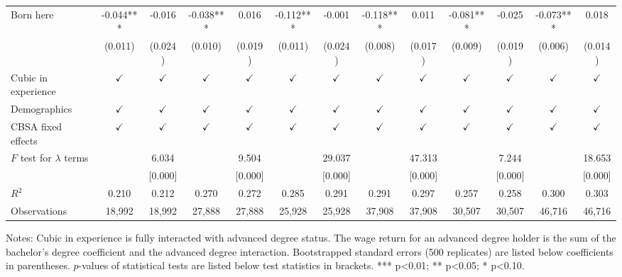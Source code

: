\begin{table}[ht]
{\begin{threeparttable}
\begin{tabular}{lcccccccccccc}
Born here & -0.044*** & -0.016 & -0.038*** & 0.016 & -0.112*** & -0.001 & -0.118*** & 0.011 & -0.081*** & -0.025 & -0.073*** & 0.018    \\
 & (0.011) & (0.024) & (0.010) & (0.019) & (0.011) & (0.024) & (0.008) & (0.017) & (0.009) & (0.019) & (0.006) & (0.014) \\
Cubic in experience & $\checkmark$ & $\checkmark$ & $\checkmark$ & $\checkmark$ & $\checkmark$ & $\checkmark$ & $\checkmark$ & $\checkmark$ & $\checkmark$ & $\checkmark$ & $\checkmark$ & $\checkmark$\\
Demographics        & $\checkmark$ & $\checkmark$ & $\checkmark$ & $\checkmark$ & $\checkmark$ & $\checkmark$ & $\checkmark$ & $\checkmark$ & $\checkmark$ & $\checkmark$ & $\checkmark$ & $\checkmark$\\
CBSA fixed effects  & $\checkmark$ & $\checkmark$ & $\checkmark$ & $\checkmark$ & $\checkmark$ & $\checkmark$ & $\checkmark$ & $\checkmark$ & $\checkmark$ & $\checkmark$ & $\checkmark$ & $\checkmark$\\
$F$ test for $\lambda$ terms   & & 6.034 & & 9.504 & & 29.037 & & 47.313 & & 7.244 & & 18.653 \\
                                & & {[}0.000{]} & & {[}0.000{]} & & {[}0.000{]} & & {[}0.000{]} & & {[}0.000{]} & & {[}0.000{]} \\
\midrule
$R^2$                           & 0.210 & 0.212 & 0.270 & 0.272 & 0.285 & 0.291 & 0.291 & 0.297 & 0.257 & 0.258 & 0.300 & 0.303 \\
Observations                    & 18,992 & 18,992 & 27,888 & 27,888 & 25,928 & 25,928 & 37,908 & 37,908 & 30,507 & 30,507 & 46,716 & 46,716 \\
\bottomrule
\end{tabular}
{\footnotesize {\raggedright Notes: Cubic in experience is fully interacted with advanced degree status. The wage return for an advanced degree holder is the sum of the bachelor's degree coefficient and the advanced degree interaction. Bootstrapped standard errors (500 replicates) are listed below coefficients in parentheses. $p$-values of statistical tests are listed below test statistics in brackets. *** p<0.01; ** p<0.05; * p<0.10.}}
\end{threeparttable}
}
\end{table}
